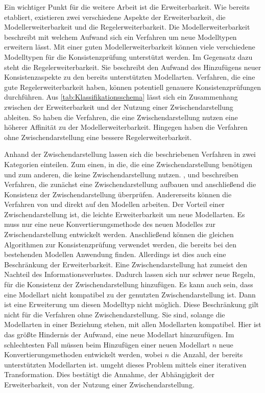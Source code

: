 Ein wichtiger Punkt für die weitere Arbeit ist die Erweiterbarkeit.
Wie bereits etabliert, existieren zwei verschiedene Aspekte der Erweiterbarkeit, die Modellerweiterbarkeit und die Regelerweiterbarkeit.
Die Modellerweiterbarkeit beschreibt mit welchem Aufwand sich ein Verfahren um neue Modelltypen erweitern lässt.
Mit einer guten Modellerweiterbarkeit können viele verschiedene Modelltypen für die Konsistenzprüfung unterstützt werden.
Im Gegensatz dazu steht die Regelerweiterbarkeit.
Sie beschreibt den Aufwand des Hinzufügens neuer Konsistenzaspekte zu den bereits unterstützten Modellarten.
Verfahren, die eine gute Regelerweiterbarkeit haben, können potentiell genauere Konsistenzprüfungen durchführen.
Aus \cref{tab:Klassifikationsschema} lässt sich ein Zusammenhang zwischen der Erweiterbarkeit und der Nutzung einer Zwischendarstellung ableiten.
So haben die Verfahren, die eine Zwischendarstellung nutzen eine höherer Affinität zu der Modellerweiterbarkeit.
Hingegen haben die Verfahren ohne Zwischendarstellung eine bessere Regelerweiterbarkeit.

Anhand der Zwischendarstellung lassen sich die beschriebenen Verfahren in zwei Kategorien einteilen.
Zum einen, in die, die eine Zwischendarstellung benötigen und zum anderen, die keine Zwischendarstellung nutzen.
\cite{Rasch2003}, \cite{Shinkawa2006} und \cite{Mens2005} beschreiben Verfahren, die zunächst eine Zwischendarstellung aufbauen und anschließend die Konsistenz der Zwischendarstellung überprüfen.
Andererseits können die Verfahren von \cite{Egyed2001} und \cite{Egyed2006} direkt auf den Modellen arbeiten.
Der Vorteil einer Zwischendarstellung ist, die leichte Erweiterbarkeit um neue Modellarten.
Es muss nur eine neue Konvertierungsmethode des neuen Modelles zur Zwischendarstellung entwickelt werden.
Anschließend können die gleichen Algorithmen zur Konsistenzprüfung verwendet werden, die bereits bei den bestehenden Modellen Anwendung finden.
Allerdings ist dies auch eine Beschränkung der Erweiterbarkeit.
Eine Zwischendarstellung hat zumeist den Nachteil des Informationsverlustes.
Dadurch lassen sich nur schwer neue Regeln, für die Konsistenz der Zwischendarstellung hinzufügen.
Es kann auch sein, dass eine Modellart nicht kompatibel zu der genutzten Zwischendarstellung ist.
Dann ist eine Erweiterung um diesen Modelltyp nicht möglich.
Diese Beschränkung gilt nicht für die Verfahren ohne Zwischendarstellung.
Sie sind, solange die Modellarten in einer Beziehung stehen, mit allen Modellarten kompatibel.
Hier ist das größte Hindernis der Aufwand, eine neue Modellart hinzuzufügen.
Im schlechtesten Fall müssen beim Hinzufügen einer neuen Modellart $n$ neue Konvertierungsmethoden entwickelt werden, wobei $n$ die Anzahl, der bereits unterstützten Modellarten ist.
\cite{Egyed2001} umgeht dieses Problem mittels einer iterativen Transformation.
Dies bestätigt die Annahme, der Abhängigkeit der Erweiterbarkeit, von der Nutzung einer Zwischendarstellung.

